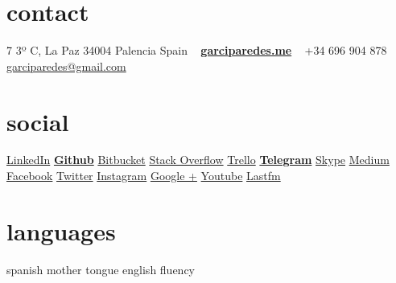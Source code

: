 \documentclass[]{friggeri-cv} %
\begin{document}


\begin{aside} %
\section{contact}
7 3º C, La Paz
34004 Palencia
Spain
~
\href{http://garciparedes.me}{\textbf{garciparedes.me}}
~
+34 696 904 878
\href{mailto:garciparedes@gmail.com}{garciparedes@gmail.com}
\section{social}
\href{https://es.linkedin.com/in/garciparedes/en}{LinkedIn\quad\faLinkedin }
\href{https://github.com/garciparedes}{\textbf{Github}\quad\faGithub }
\href{https://bitbucket.org/garciparedes/}{Bitbucket\quad\faBitbucket }
\href{http://stackoverflow.com/users/3921457/garciparedes}{Stack Overflow\quad\faStackOverflow }
\href{https://trello.com/garciparedes}{Trello\quad\faTrello }
\href{https://telegram.me/garciparedes}{\textbf{Telegram}\quad\faPaperPlane }
\href{skype:garciparedes?call}{Skype\quad\faSkype }
\href{https://medium.com/@garciparedes}{Medium\quad\faMedium }
\href{https://facebook.com/garciparedes}{Facebook\quad\faFacebook}
\href{https://twitter.com/garciparedes}{Twitter\quad\faTwitter }
\href{https://www.instagram.com/garciparedes/}{Instagram\quad\faInstagram }
\href{https://plus.google.com/+SergioGarcia-garciparedes/}{Google +\quad\faGooglePlus }
\href{https://www.youtube.com/user/GaRcYpArEdEs/}{Youtube\quad\faYoutubePlay }
\href{http://www.last.fm/user/garciparedes/}{Lastfm\quad\faLastfm}
\section{languages}
spanish mother tongue
english fluency
\begin{comment}
\section{programming}
Java\quad{\color{red} $\varheartsuit\varheartsuit\varheartsuit\varheartsuit\varheartsuit$}{\color{black} $\varheartsuit$}
Python\quad{\color{red} $\varheartsuit\varheartsuit\varheartsuit$}{\color{black} $\varheartsuit\varheartsuit\varheartsuit$}
JavaScript\quad{\color{red} $\varheartsuit\varheartsuit\varheartsuit\varheartsuit$}{\color{black} $\varheartsuit\varheartsuit$}
 C\quad{\color{red} $\varheartsuit\varheartsuit\varheartsuit\varheartsuit$}{\color{black} $\varheartsuit\varheartsuit$}
 C++\quad{\color{red} $\varheartsuit\varheartsuit\varheartsuit\varheartsuit$}{\color{black} $\varheartsuit\varheartsuit$}

\end{comment}
\end{aside}
\end{document}
